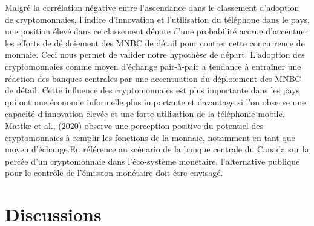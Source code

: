 \documentclass[12pt]{article}
\begin{document}
Malgré la corrélation négative entre l'ascendance dans le classement d'adoption de cryptomonnaies, l'indice d'innovation et l'utilisation du téléphone dans le pays, une position élevé dans ce classement dénote d'une probabilité accrue d'accentuer les efforts de déploiement des MNBC de détail pour contrer cette concurrence de monnaie. Ceci nous permet de valider notre hypothèse de départ. L'adoption des cryptomonnaies comme moyen d'échange pair-à-pair a tendance à entraîner une réaction des banques centrales par une accentuation du déploiement des MNBC de détail. Cette influence des cryptomonnaies est plus importante dans les pays qui ont une économie informelle plus importante et davantage si l'on observe une capacité d'innovation élevée et une forte utilisation de la téléphonie mobile. Mattke et al., (2020)\cite{mattke_is_2020} observe une perception positive du potentiel des cryptomonnaies à remplir les fonctions de la monnaie, notamment en tant que moyen d'échange.En référence au scénario de la banque centrale du Canada sur la percée d'un cryptomonnaie dans l'éco-système monétaire, l'alternative publique pour le contrôle de l'émission monétaire doit être envisagé. 


\section{Discussions}
\end{document}
